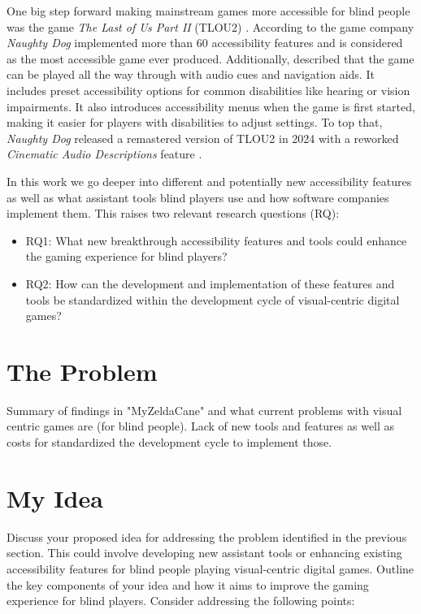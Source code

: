 \documentclass[sigconf,natbib=false,10pt]{acmart}
\begin{document}
	One big step forward making mainstream games more accessible for blind people was the game \emph{The Last of Us Part II} (TLOU2) \cite{playstation_last_nodate, playstation_last_nodate-1}. 
	According to \textcite{leite_extended_2021} the game company \emph{Naughty Dog} implemented more than 60 accessibility features and is considered as the most accessible game ever produced.
	Additionally, \textcite{dale_last_2024} described that the game can be played all the way through with audio cues and navigation aids.
	It includes preset accessibility options for common disabilities like hearing or vision impairments. 
	It also introduces accessibility menus when the game is first started, making it easier for players with disabilities to adjust settings.
	To top that, \emph{Naughty Dog} released a remastered version of TLOU2 in 2024 with a reworked \emph{Cinematic Audio Descriptions} feature \cite{playstation_last_nodate-2}.
	
	In this work we go deeper into different and potentially new accessibility features as well as what assistant tools blind players use and how software companies implement them.
	This raises two relevant research questions (RQ):
	
	\begin{itemize}
		\item RQ1: What new breakthrough accessibility features and tools could enhance the gaming experience for blind players?
		\item RQ2: How can the development and implementation of these features and tools be standardized within the development cycle of visual-centric digital games?
	\end{itemize}
	
	\section{The Problem}
	Summary of findings in "MyZeldaCane" and what current problems with visual centric games are (for blind people).
	Lack of new tools and features as well as costs for standardized the development cycle to implement those.
	
	\section{My Idea}
	Discuss your proposed idea for addressing the problem identified in the previous section. This could involve developing new assistant tools or enhancing existing accessibility features for blind people playing visual-centric digital games. Outline the key components of your idea and how it aims to improve the gaming experience for blind players. Consider addressing the following points:
	
\end{document}
